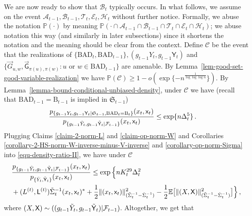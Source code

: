 \documentclass[11pt]{article}
\numberwithin{equation}{section}
\begin{document}
We are now ready to show that $\mathcal{B}_{t}$ typically occurs. In what follows, we assume on the event $\mathcal{A}_{t-1}, \mathcal{B}_{t-1}, \mathcal{T}_{t}, \mathcal{E}_{t}, \mathcal{H}_{t}$ without further notice. Formally, we abuse the notation $\mathbb P(\cdot)$ by meaning $\mathbb P(\cdot \cap \mathcal{A}_{t-1} \cap \mathcal{B}_{t-1} \cap \mathcal{T}_{t} \cap \mathcal{E}_{t} \cap \mathcal{H}_{t})$; we abuse notation this way (and similarly in later subsections) since it shortens the notation and the meaning should be clear from the context. Define $\mathcal{C}$ be the event that the realizations of $\{ \mathrm{BAD}_t, \mathrm{BAD}_{t-1} \}, (g_{t-1} Y_t, g_{t-1} \mathsf{Y}_t )$ and $\{ \overrightarrow{G}_{u,w}, \overrightarrow{\mathsf{G}}_{\pi(u),\pi(w)} : u \mbox{ or } w \in \mathrm{BAD}_{t-1} \}$ are amenable. By Lemma~\ref{lem-good-set-good-variable-realization} we have $\mathbb{P}(\mathcal{C}) \geq 1 - o( \exp \{ - n^{ \frac{1}{\log \log \log n}} \})$. By Lemma~\ref{lemma-bound-conditional-unbiased-density}, under $\mathcal{C}$ we have (recall that $\mathrm{BAD}_{t-1} = \mathrm B_{t-1}$ is implied in $\mathfrak S_{t-1}$)
\begin{align*}
    & \frac{ p_{ \{ g_{t-1} Y_t , g_{t-1} \mathsf{Y}_t | \mathfrak{S}_{t-1} , \mathrm{BAD}_t = \mathrm{B}_t\} } (x_{t}, \mathsf{x}_t) }{ p_{ \{ g_{t-1} \Tilde{Y}_t , g_{t-1} \Tilde{\mathsf{Y}}_t | \mathcal{F}_{t-1} \} } (x_{t}, \mathsf{x}_t)} \leq \exp \{ n \Delta_t^5  \} \,.
\end{align*}
Plugging Claims \ref{claim-2-norm-L} and \ref{claim-op-norm-W} and Corollaries \ref{corollary-2-HS-norm-W-inverse-minus-V-inverse} and \ref{corollary-op-norm-Sigma} into \eqref{equ-density-ratio-II}, we have under $\mathcal{C}$
\begin{align*}
    & \frac{ p_{\{ g_{t-1} \Tilde{Y}_t , g_{t-1} \Tilde{\mathsf{Y}}_t | \mathcal{F}_{t-1} \}}  (x_{t}, \mathsf{x}_t) }{ p_{\{ \Check{Y}_t ,  \Check{\mathsf{Y}}_t  \}} (x_{t}, \mathsf{x}_t) } \leq \exp \Big\{ n K_{t}^{29} \Delta_{t}^2 \\
    &+  ( L^{(t)} , \mathsf{L}^{(t)} ) \Tilde{\Sigma}_{t}^{-1} ( x_{t},\mathsf{x}_{t} )^{*} 
    + \frac{1}{2} \| ( x_{t} , \mathsf{x}_{t} ) \|^2_{ (\Tilde{\Sigma}_{t}^{-1} - \Check{\Sigma}_{t}^{-1}) } - \frac{1}{2} \mathbb{E} \big[ \| (X , \mathsf{X} ) \|^2_{ (\Tilde{\Sigma}_{t}^{-1} - \Check{\Sigma}_{t}^{-1}) } \big]  \Big\} \,,
\end{align*}
where $(X,\mathsf{X}) \sim (( g_{t-1} \Tilde{Y}_t, g_{t-1} \Tilde{\mathsf{Y}}_t ) | \mathcal{F}_{t-1})$. Altogether, we get that
\end{document}
